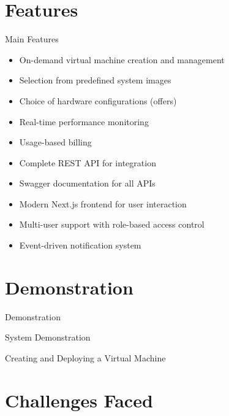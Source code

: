 \documentclass{beamer}
\begin{document}
\section{Features}

\begin{frame}{Main Features}
  \begin{itemize}
    \item On-demand virtual machine creation and management
    \item Selection from predefined system images
    \item Choice of hardware configurations (offers)
    \item Real-time performance monitoring
    \item Usage-based billing
    \item Complete REST API for integration
    \item Swagger documentation for all APIs
    \item Modern Next.js frontend for user interaction
    \item Multi-user support with role-based access control
    \item Event-driven notification system
  \end{itemize}
\end{frame}

\section{Demonstration}

\begin{frame}{Demonstration}
  \begin{center}
    \huge{System Demonstration}
    
    \vspace{1cm}
    
    \large{Creating and Deploying a Virtual Machine}
  \end{center}
\end{frame}

\section{Challenges Faced}
\end{document}
